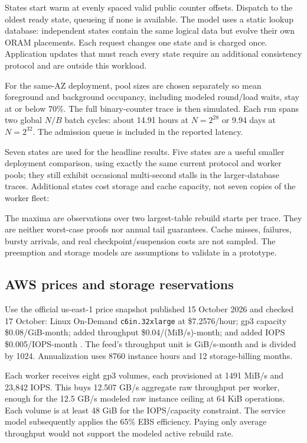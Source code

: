 \documentclass[11pt]{article}
\begin{document}
States start warm at evenly spaced valid public counter offsets. Dispatch
to the oldest ready state, queueing if none is available. The model uses a
static lookup database: independent states contain the same logical data
but evolve their own ORAM placements. Each request changes one state and
is charged once. Application updates that must reach every state require
an additional consistency protocol and are outside this workload.

For the same-AZ deployment, pool sizes are chosen separately so mean foreground and background
occupancy, including modeled round/load waits, stay at or below 70\%.
The full binary-counter trace is then simulated. Each run spans two global
$N/B$ batch cycles: about 14.91 hours at $N=2^{28}$ or 9.94 days at
$N=2^{32}$. The admission queue is included in the reported latency.

Seven states are used for the headline results. Five states are a useful
smaller deployment comparison, using exactly the same current protocol
and worker pools; they still exhibit occasional multi-second stalls in
the larger-database traces. Additional states cost storage and cache
capacity, not seven copies of the worker fleet:


The maxima are observations over two largest-table rebuild starts per
trace. They are neither worst-case proofs nor annual tail guarantees.
Cache misses, failures, bursty arrivals, and real checkpoint/suspension
costs are not sampled. The preemption and storage models are assumptions
to validate in a prototype.

\subsection{AWS prices and storage reservations}
Use the official us-east-1 price snapshot published 15 October 2026 and
checked 17 October: Linux On-Demand \texttt{c6in.32xlarge} at \$7.2576/hour;
gp3 capacity \$0.08/GiB-month; added throughput \$0.04/(MiB/s)-month; and
added IOPS \$0.005/IOPS-month \cite{aws-prices,aws-gp3}. The feed's
throughput unit is GiB/s-month and is divided by 1024. Annualization uses
8760 instance hours and 12 storage-billing months.

Each worker receives eight gp3 volumes, each provisioned at 1491 MiB/s
and 23,842 IOPS. This buys 12.507 GB/s aggregate raw throughput per worker,
enough for the 12.5 GB/s modeled raw instance ceiling at 64 KiB operations.
Each volume is at least 48 GiB for the IOPS/capacity constraint. The service
model subsequently applies the 65\% EBS efficiency. Paying only average
throughput would not support the modeled active rebuild rate.
\end{document}
